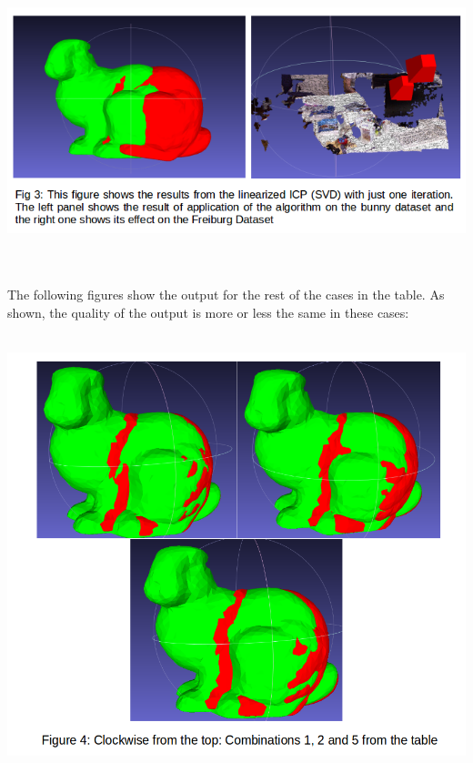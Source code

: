 \documentclass[a4paper,pagesize 10pt]{scrartcl}
\begin{document}
\\\\
\begin{center}
    \includegraphics[scale=0.60]{SVD_1_iter.png}
\end{center}
\\\\
\normalsize{The following figures show the output for the rest of the cases in the table. As shown, the quality of the output is more or less the same in these cases:} \\\\
\begin{center}
    \includegraphics[scale=0.45]{bunny_results.png}
\end{center}
\end{document}

